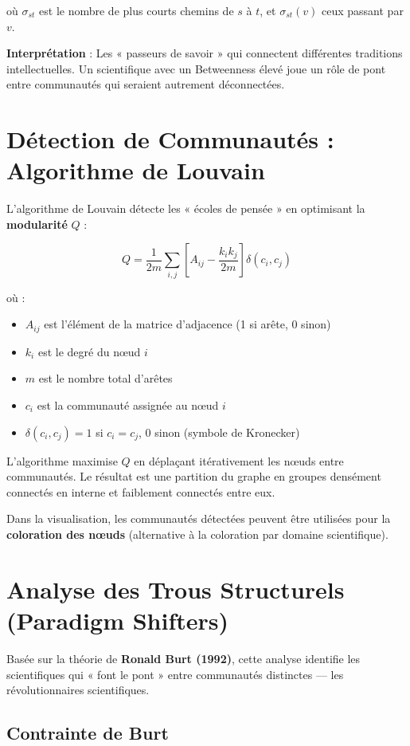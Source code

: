 \documentclass[12pt,a4paper]{report}
\begin{document}
où $\sigma_{st}$ est le nombre de plus courts chemins de $s$ à $t$, et $\sigma_{st}(v)$ ceux passant par $v$.

\textbf{Interprétation} : Les « passeurs de savoir » qui connectent différentes traditions intellectuelles. Un scientifique avec un Betweenness élevé joue un rôle de pont entre communautés qui seraient autrement déconnectées.

\section{Détection de Communautés : Algorithme de Louvain}

L'algorithme de Louvain détecte les « écoles de pensée » en optimisant la \textbf{modularité} $Q$ :

$$Q = \frac{1}{2m} \sum_{i,j} \left[ A_{ij} - \frac{k_i k_j}{2m} \right] \delta(c_i, c_j)$$

où :
\begin{itemize}
    \item $A_{ij}$ est l'élément de la matrice d'adjacence (1 si arête, 0 sinon)
    \item $k_i$ est le degré du nœud $i$
    \item $m$ est le nombre total d'arêtes
    \item $c_i$ est la communauté assignée au nœud $i$
    \item $\delta(c_i, c_j) = 1$ si $c_i = c_j$, 0 sinon (symbole de Kronecker)
\end{itemize}

L'algorithme maximise $Q$ en déplaçant itérativement les nœuds entre communautés. Le résultat est une partition du graphe en groupes densément connectés en interne et faiblement connectés entre eux.

Dans la visualisation, les communautés détectées peuvent être utilisées pour la \textbf{coloration des nœuds} (alternative à la coloration par domaine scientifique).

\section{Analyse des Trous Structurels (Paradigm Shifters)}

Basée sur la théorie de \textbf{Ronald Burt (1992)}, cette analyse identifie les scientifiques qui « font le pont » entre communautés distinctes — les révolutionnaires scientifiques.

\subsection{Contrainte de Burt}
\end{document}

